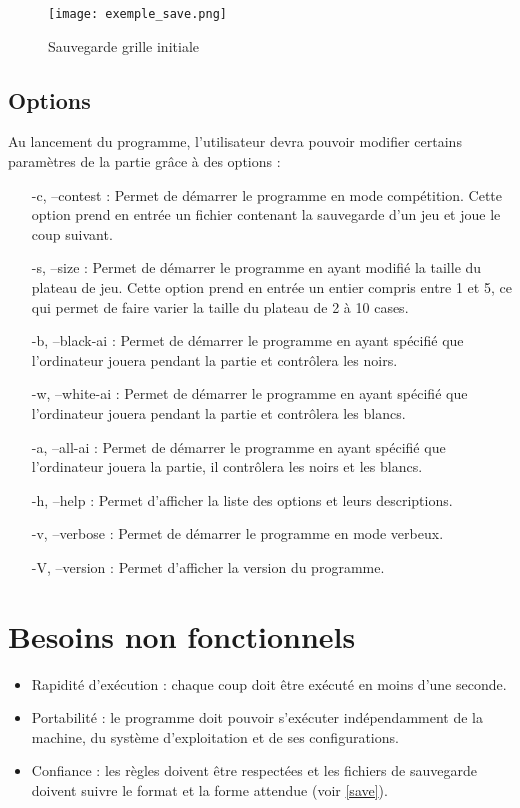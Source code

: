 \documentclass[10pt,a4paper]{article}
\begin{document}
\begin{figure}[H]
\centering
\texttt{[image: exemple\_save.png]}
\label{exemple_save}
\caption{Sauvegarde grille initiale}
\end{figure}

\subsection{Options}
\label{options}

Au lancement du programme, l'utilisateur devra pouvoir modifier certains paramètres de la partie grâce à des options :\\
\begin{itemize}
\item [-c, --contest] : Permet de démarrer le programme en mode compétition. Cette option prend en entrée un fichier contenant la sauvegarde d'un jeu et joue le coup suivant.
\item [-s, --size] : Permet de démarrer le programme en ayant modifié la taille du plateau de jeu. Cette option prend en entrée un entier compris entre 1 et 5, ce qui permet de faire varier la taille du plateau de 2 à 10 cases.
\item [-b, --black-ai] : Permet de démarrer le programme en ayant spécifié que l'ordinateur jouera pendant la partie et contrôlera les noirs.
\item [-w, --white-ai] : Permet de démarrer le programme en ayant spécifié que l'ordinateur jouera pendant la partie et contrôlera les blancs.
\item [-a, --all-ai] : Permet de démarrer le programme en ayant spécifié que l'ordinateur jouera la partie, il contrôlera les noirs et les blancs.
\item [-h, --help] : Permet d'afficher la liste des options et leurs descriptions.
\item [-v, --verbose]: Permet de démarrer le programme en mode verbeux.
\item [-V, --version]: Permet d'afficher la version du programme.
\end{itemize}
\newpage

\section{Besoins non fonctionnels}

\begin{itemize} 
\item Rapidité d'exécution : chaque coup doit être exécuté en moins d'une seconde.
\item Portabilité : le programme doit pouvoir s'exécuter indépendamment de la machine, du système d'exploitation et de ses configurations.
\item Confiance : les règles doivent être respectées et les fichiers de sauvegarde doivent suivre le format et la forme attendue (voir \ref{save}).
\end{itemize}
\end{document}
